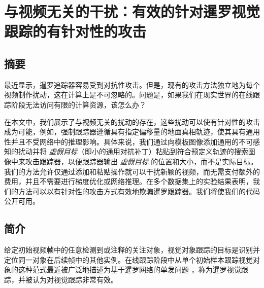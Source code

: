 \chapter{与视频无关的干扰：有效的针对暹罗视觉跟踪的有针对性的攻击} \label{chap:attack}

\section{摘要}
最近显示，暹罗追踪器容易受到对抗性攻击。但是，现有的攻击方法独立地为每个视频制作扰动，这在计算上是不可忽略的。问题是，如果我们在现实世界的在线跟踪阶段无法访问有限的计算资源，该怎么办？

在本文中，我们展示了与视频无关的扰动的存在，这些扰动可以使有针对性的攻击成为可能，例如，强制跟踪器遵循具有指定偏移量的地面真相轨迹，使其具有通用性并且不受网络中的推理影响。具体来说，我们通过向模板图像添加通用的不可感知的扰动并将 \textit{虚假目标}（即小的通用对抗补丁）粘贴到符合预定义轨迹的搜索图像中来攻击跟踪器，以便跟踪器输出 \textit{虚假目标} 的位置和大小，而不是实际目标。我们的方法允许仅通过添加和粘贴操作就可以干扰新颖的视频，而无需支付额外的费用，并且不需要进行梯度优化或网络推理。在多个数据集上的实验结果表明，我们的方法可以以有针对性的攻击方式有效地欺骗暹罗跟踪器。我们将使我们的代码公开可用。

\section{简介}

给定初始视频帧中的任意检测到或注释的关注对象，视觉对象跟踪的目标是识别并定位同一对象在后续帧中的其他实例。在线跟踪阶段中从单个初始样本跟踪视觉对象的这种范式最近被广泛地描述为基于暹罗网络的单发问题 \cite{SiamFC,SiamRPN,SiamRPN++,SiamFC++}，称为暹罗视觉跟踪，并被认为对视觉跟踪非常有效。

